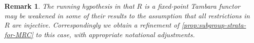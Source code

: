 \documentclass[11pt,dvipsnames]{amsart}
\theoremstyle{BoldRemark}
\newtheorem{remark}[theorem]{Remark}
\begin{document}
\begin{remark}
    The running hypothesis in \cite[Section 6]{4DS} that $R$ is a fixed-point Tambara functor may be weakened in some of their results to the assumption that all restrictions in $R$ are injective. Correspondingly we obtain a refinement of \cref{prop:subgroup-strata-for-MRC} to this case, with appropriate notational adjustments.
\end{remark}




\end{document}
